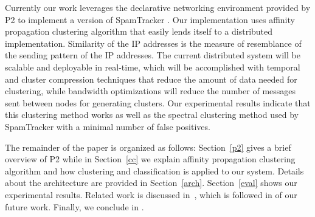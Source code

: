 Currently our work leverages the declarative networking environment provided by P2 to implement a version of SpamTracker \cite{bb}. Our implementation uses affinity propagation clustering algorithm that easily lends itself to a distributed implementation. Similarity of the IP addresses is the measure of resemblance of the sending pattern of the IP addresses. The current distributed system will be  scalable and deployable in real-time, which will be accomplished with temporal and cluster compression techniques that reduce the amount of data needed for clustering, while bandwidth optimizations will reduce the number of messages sent between nodes for generating clusters. Our experimental results indicate that this clustering method works as well as the spectral clustering method used by SpamTracker \cite{bb} with a minimal number of false positives. 

The remainder of the paper is organized as follows: Section~\ref{p2} gives a brief overview of P2 while in Section~\ref{cc} we explain affinity propagation clustering algorithm and how clustering and classification is applied to our system. Details about the architecture are provided in Section~\ref{arch}. Section~\ref{eval} shows our experimental results. Related work is discussed in~, which is followed in  of our future work. Finally, we conclude in .
